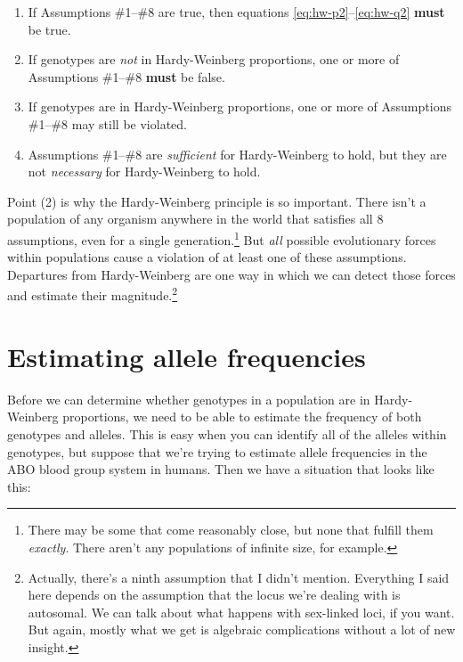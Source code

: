 \begin{enumerate}

\item If Assumptions \#1--\#8 are true, then equations
  \ref{eq:hw-p2}--\ref{eq:hw-q2} {\bf must} be true.

\item If genotypes are {\it not\/} in Hardy-Weinberg proportions, one
  or more of Assumptions \#1--\#8 {\bf must} be false.

\item If genotypes are in Hardy-Weinberg proportions, one or more of
  Assumptions \#1--\#8 may still be violated.

\item Assumptions \#1--\#8 are {\it sufficient\/} for Hardy-Weinberg
  to hold, but they are not {\it necessary\/} for Hardy-Weinberg to
  hold.

\end{enumerate}

Point (2) is why the Hardy-Weinberg principle is so important. There
isn't a population of any organism anywhere in the world that
satisfies all 8 assumptions, even for a single
generation.\footnote{There may be some that come reasonably close, but
  none that fulfill them {\it exactly}. There aren't any populations
  of infinite size, for example.}  But {\it all\/} possible
evolutionary forces within populations cause a violation of at least
one of these assumptions. Departures from Hardy-Weinberg are one way
in which we can detect those forces and estimate their
magnitude.\footnote{Actually, there's a ninth assumption that I didn't
  mention. Everything I said here depends on the assumption that the
  locus we're dealing with is autosomal. We can talk about what
  happens with sex-linked loci, if you want. But again, mostly what we
  get is algebraic complications without a lot of new insight.}

\section*{Estimating allele frequencies}

Before we can determine whether genotypes in a population are in
Hardy-Weinberg proportions, we need to be able to estimate the
frequency of both genotypes and alleles. This is easy when you can
identify all of the alleles within genotypes, but suppose that we're
trying to estimate allele frequencies in the ABO blood group system in
humans. Then we have a situation that looks like this:

